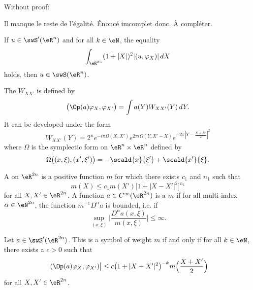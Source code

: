 Without proof:
\begin{probleme}
Il manque le reste de l'égalité. Énoncé imcomplet donc. À compléter.
\end{probleme}

\begin{proposition}
If $u\in\swS'(\eR^n)$ and for all $k\in\eN$, the equality
\[ 
  \int_{\eR^{2n}} (1+| X |)^2 | (u,\varphi_X) |\,dX
\]
holds, then $u\in\swS(\eR^n)$.
\end{proposition}

The  $W_{XX'}$ is defined by
\begin{equation}
  \big( \Op(a)\varphi_X,\varphi_{X'} \big)=\int a(Y)W_{XX'}(Y)\,dY.
\end{equation}
It can be developed under the form
\begin{equation}
  W_{XX'}(Y)=2^n e^{-i\pi\Omega(X,X')} e^{2\pi i\Omega(Y,X'-X)} e^{-2\pi\left|  Y-\frac{ X+X' }{ 2 }  \right|^2}
\end{equation}
where $\Omega$ is the symplectic form on $\eR^n\times\eR^n$ defined by
\[ 
  \Omega\big( (x,\xi),(x',\xi') \big)=-\scald{ x }{ \xi' }+\scald{ x' }{ \xi }.
\]

A  on $\eR^{2n}$ is a positive function $m$ for which there exists $c_1$ and $n_1$ such that
\[ 
  m(X)\leq c_1m(X')\big[ 1+| X-X' |^2 \big]^{n_1}
\]
for all $X,X'\in\eR^{2n}$. A function $a\in C^{\infty}(\eR^{2n})$ is a  $m$ if  for all multi-index $\alpha\in\eN^{2n}$, the function $m^{-1}D^{\alpha}a$ is bounded, i.e. if
\[ 
  \sup_{(x,\xi)}\Big|  \frac{ D^{\alpha}a(x,\xi) }{ m(x,\xi) } \Big|\leq\infty.
\]


\begin{theorem}
   Let $a\in\swS'(\eR^{2n})$. This is a symbol of weight $m$ if and only if for all $k\in\eN$, there exists a $c>0$ such that 
\[ 
  \big|  (\Op(a)\varphi_X,\varphi_{X'})  \big|\leq c\big( 1+| X-X' |^2 \big)^{-k}m\Big( \frac{ X+X' }{2} \Big)
\]
for all $X,X'\in\eR^{2n}$.
\end{theorem}





